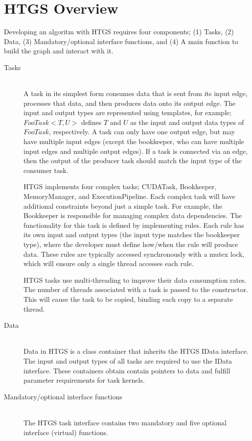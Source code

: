 \documentclass[]{article}
\begin{document}
\section{HTGS Overview}

Developing an algoritm with HTGS requires four components; (1) Tasks, (2) Data, (3) Mandatory/optional interface functions, and (4) A main function to build the graph and interact with it. 


\begin{description}
\item[Tasks] \hfill \\
	A task in its simplest form consumes data that is sent from its input edge, processes that data, and then produces data onto its output edge. The input and output types are represented using templates, for example; $FooTask<T, U>$ defines $T$ and $U$ as the input and output data types of $FooTask$, respectively. A task can only have one output edge, but may have multiple input edges (except the bookkeeper, who can have multiple input edges and multiple output edges). If a task is connected via an edge, then the output of the producer task should match the input type of the consumer task.
	
	HTGS implements four complex tasks; CUDATask, Bookkeeper, MemoryManager, and ExecutionPipeline. Each complex task will have additional constraints beyond just a simple task.  For example, the Bookkeeper is responsible for managing complex data dependencies. The functionality for this task is defined by implementing rules. Each rule has its own input and output types (the input type matches the bookkeeper type), where the developer must define how/when the rule will produce data. These rules are typically accessed synchronously with a mutex lock, which will ensure only a single thread accesses each rule. 
	
    HTGS tasks use multi-threading to improve their data consumption rates. The number of threads associated with a task is passed to the constructor. This will cause the task to be copied, binding each copy to a separate thread.
	
\item[Data] \hfill \\	
	Data in HTGS is a class container that inherits the HTGS IData interface. The input and output types of all tasks are required to use the IData interface. These containers obtain contain pointers to data and fulfill parameter requirements for task kernels.
	
\item[Mandatory/optional interface functions] \hfill \\
	The HTGS task interface contains two mandatory and five optional interface (virtual) functions.
	

\end{description}
\end{document}
